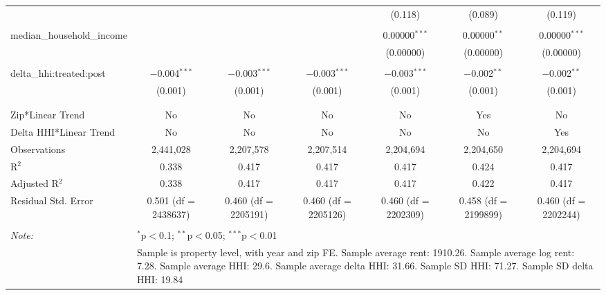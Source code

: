 \begin{table}[H]
{\begin{tabular}{@{\extracolsep{5pt}}lcccccc}
   &  &  &  & (0.118) & (0.089) & (0.119) \\  

   & & & & & & \\  

  median\_household\_income &  &  &  & 0.00000$^{***}$ & 0.00000$^{**}$ & 0.00000$^{***}$ \\  

   &  &  &  & (0.00000) & (0.00000) & (0.00000) \\  

   & & & & & & \\  

  delta\_hhi:treated:post & $-$0.004$^{***}$ & $-$0.003$^{***}$ & $-$0.003$^{***}$ & $-$0.003$^{***}$ & $-$0.002$^{**}$ & $-$0.002$^{**}$ \\  

   & (0.001) & (0.001) & (0.001) & (0.001) & (0.001) & (0.001) \\  

   & & & & & & \\  

 \hline \\[-1.8ex]  

 Zip*Linear Trend & No & No & No & No & Yes & No \\  

 Delta HHI*Linear Trend & No & No & No & No & No & Yes \\  

 Observations & 2,441,028 & 2,207,578 & 2,207,514 & 2,204,694 & 2,204,650 & 2,204,694 \\  

 R$^{2}$ & 0.338 & 0.417 & 0.417 & 0.417 & 0.424 & 0.417 \\  

 Adjusted R$^{2}$ & 0.338 & 0.417 & 0.417 & 0.417 & 0.422 & 0.417 \\  

 Residual Std. Error & 0.501 (df = 2438637) & 0.460 (df = 2205191) & 0.460 (df = 2205126) & 0.460 (df = 2202309) & 0.458 (df = 2199899) & 0.460 (df = 2202244) \\  

 \hline  

 \hline \\[-1.8ex]  

 \textit{Note:}  & \multicolumn{6}{l}{$^{*}$p$<$0.1; $^{**}$p$<$0.05; $^{***}$p$<$0.01} \\  

  & \multicolumn{6}{l}{Sample is property level, with year and zip FE. Sample average rent: 1910.26. Sample average log rent: 7.28. Sample average HHI: 29.6. Sample average delta HHI: 31.66. Sample SD HHI: 71.27. Sample SD delta HHI: 19.84} \\  

 \end{tabular}}  

 \end{table}  

